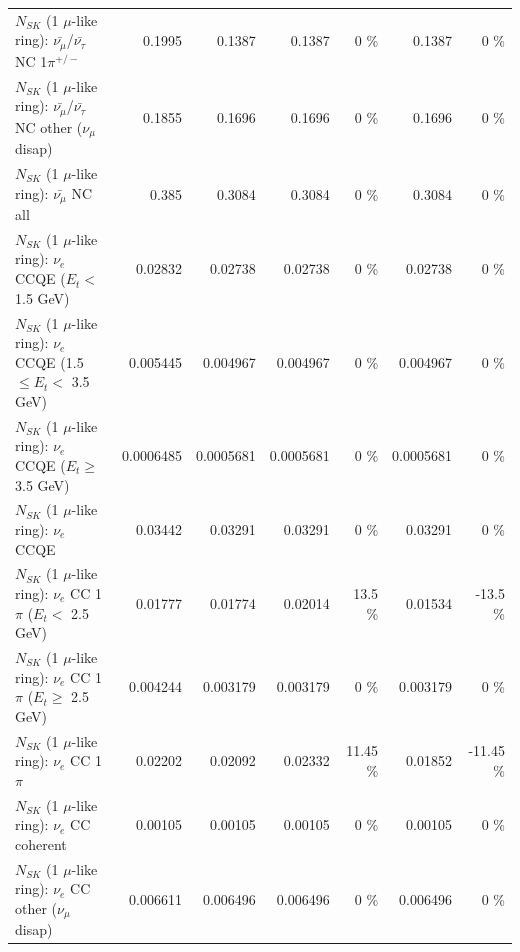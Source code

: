 \begin{table}
\begin{tabular}{| l | r | r | r  r | r  r |}
\hline
  $N_{SK}$ (1 $\mu$-like ring): $\bar{\nu_\mu}$/$\bar{\nu_\tau}$ NC 1$\pi^{+/-}$ &          0.1995 &          0.1387 &          0.1387 &        0 \%  &          0.1387 &        0 \%  \\ 
$N_{SK}$ (1 $\mu$-like ring): $\bar{\nu_\mu}$/$\bar{\nu_\tau}$ NC other ($\nu_\mu$ disap) &          0.1855 &          0.1696 &          0.1696 &        0 \%  &          0.1696 &        0 \%  \\ 
                          $N_{SK}$ (1 $\mu$-like ring): $\bar{\nu_{\mu}}$ NC all &           0.385 &          0.3084 &          0.3084 &        0 \%  &          0.3084 &        0 \%  \\ 
\hline
\hline
\hline
                  $N_{SK}$ (1 $\mu$-like ring): $\nu_e$ CCQE ($E_{t} <$ 1.5 GeV) &         0.02832 &         0.02738 &         0.02738 &        0 \%  &         0.02738 &        0 \%  \\ 
         $N_{SK}$ (1 $\mu$-like ring): $\nu_e$ CCQE (1.5 $\leq E_{t} <$ 3.5 GeV) &        0.005445 &        0.004967 &        0.004967 &        0 \%  &        0.004967 &        0 \%  \\ 
               $N_{SK}$ (1 $\mu$-like ring): $\nu_e$ CCQE ($E_{t} \geq$ 3.5 GeV) &       0.0006485 &       0.0005681 &       0.0005681 &        0 \%  &       0.0005681 &        0 \%  \\ 
\hline
                                      $N_{SK}$ (1 $\mu$-like ring): $\nu_e$ CCQE &         0.03442 &         0.03291 &         0.03291 &        0 \%  &         0.03291 &        0 \%  \\ 
\hline
             $N_{SK}$ (1 $\mu$-like ring): $\nu_e$ CC 1$\pi$ ($E_{t} <$ 2.5 GeV) &         0.01777 &         0.01774 &         0.02014 &     13.5 \%  &         0.01534 &    -13.5 \%  \\ 
          $N_{SK}$ (1 $\mu$-like ring): $\nu_e$ CC 1$\pi$ ($E_{t} \geq$ 2.5 GeV) &        0.004244 &        0.003179 &        0.003179 &        0 \%  &        0.003179 &        0 \%  \\ 
\hline
                                 $N_{SK}$ (1 $\mu$-like ring): $\nu_e$ CC 1$\pi$ &         0.02202 &         0.02092 &         0.02332 &    11.45 \%  &         0.01852 &   -11.45 \%  \\ 
                               $N_{SK}$ (1 $\mu$-like ring): $\nu_e$ CC coherent &         0.00105 &         0.00105 &         0.00105 &        0 \%  &         0.00105 &        0 \%  \\ 
                $N_{SK}$ (1 $\mu$-like ring): $\nu_e$ CC other ($\nu_\mu$ disap) &        0.006611 &        0.006496 &        0.006496 &        0 \%  &        0.006496 &        0 \%  \\ 

\end{tabular}
\end{table}
